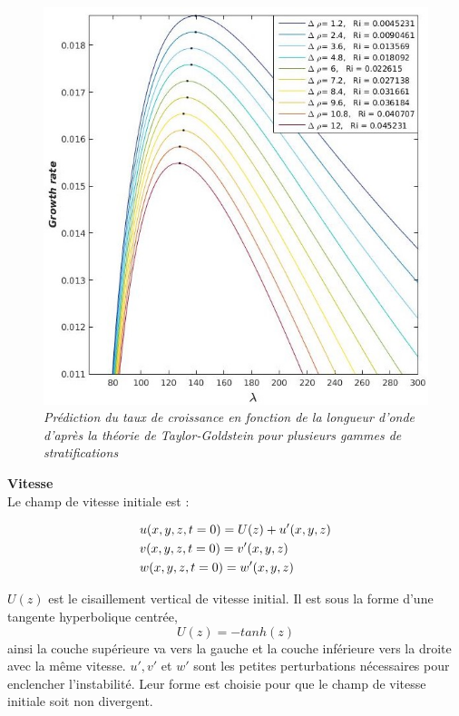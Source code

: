 \documentclass[a4paper,12pt]{article}
\begin{document}
    \begin{figure}[!h]
	\centering		
		\includegraphics[width=0.75\linewidth]{figures/TG_delatrho.jpg}
\caption[Taylor-Goldstein]{\textit{Prédiction du taux de croissance en fonction de la longueur d'onde d'après la théorie de Taylor-Goldstein pour plusieurs gammes de stratifications}}
	\label{TG_deltarho}
\end{figure}
    \newline
    \textbf{Vitesse} \\
    Le champ de vitesse initiale est : 
    \begin{subequation}
    \begin{align}
        \displaystyle
            \label{u_ini}
            & u(x,y,z,t=0)=U(z)+u'(x,y,z) \\
            \label{v_ini}
            & v(x,y,z,t=0)=v'(x,y,z) \\
            \label{w_ini}
            & w(x,y,z,t=0)=w'(x,y,z)
    \end{align}
    \end{subequation}
    $U(z)$ est le cisaillement vertical de vitesse initial. Il est sous la forme d'une tangente hyperbolique centrée,
    \begin{equation}
        \label{u0_ini}
        U(z)=-tanh(z)
    \end{equation}
    ainsi la couche supérieure va vers la gauche et la couche inférieure vers la droite avec la même vitesse. $u', v'$ et $w'$ sont les petites perturbations nécessaires pour enclencher l'instabilité. Leur forme est choisie pour que le champ de vitesse initiale soit non divergent.
\end{document}
